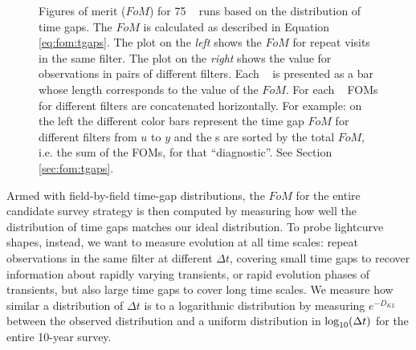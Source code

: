  \begin{figure}[!th]
 \centering
\caption{Figures of merit ($FoM$) for  75 \opsim~ runs based on the distribution of time gaps. The $FoM$ is calculated as described in Equation \ref{eq:fom:tgaps}. The plot on the \emph{left} shows the $FoM$ for repeat visits in the same filter.  The plot on the \emph{right} shows the value for observations in pairs of different filters. Each \opsim~ is presented as a bar whose length corresponds to the value of the $FoM$. For each \opsim~ FOMs for different filters are concatenated horizontally. For example: on the left the different color bars represent the time gap $FoM$ for different filters from $u$ to $y$  and the \opsim s are sorted by the total $FoM$, i.e. the sum of the FOMs, for that ``diagnostic''.  See Section \ref{sec:fom:tgaps}.  }
\label{fig:tgapsFOM}
\end{figure}
Armed with field-by-field time-gap distributions, the $FoM$ for the entire candidate survey strategy is then computed by measuring how well the distribution of time gaps matches our ideal distribution. 
 
To probe lightcurve shapes, instead, we want to measure evolution at all time scales: repeat observations in the same filter at different  $\Delta t$, covering small time gaps to recover information about rapidly varying transients, or rapid evolution phases of transients, but also large time gaps to cover long time scales. We measure how similar a distribution of $\Delta t$  is to a logarithmic distribution by measuring $e^{-D_{KL}}$ between the observed distribution and a uniform distribution in $\log_{\rm 10}(\Delta t)$ for the entire 10-year survey.



